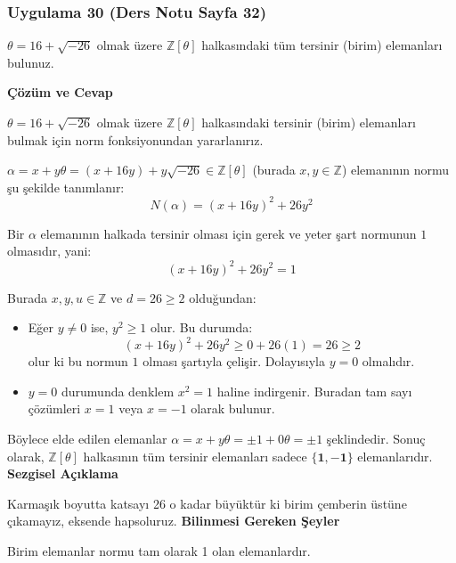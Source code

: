 \documentclass[11pt, a4paper]{article}
\newenvironment{cozum}{
    \vspace{0.5cm}
    \noindent\textcolor{green!60!black}{\faCheckCircle\enspace \textbf{\Large Çözüm ve Cevap}}\par\vspace{0.2cm}
}{}
\newenvironment{sezgisel}{
    \vspace{0.5cm}
    \noindent\textcolor{orange!80!black}{\faLightbulb\enspace \textbf{\Large Sezgisel Açıklama}}\par\vspace{0.2cm}
    \itshape
}{}
\newenvironment{bilgi}{
    \vspace{0.5cm}
    \noindent\textcolor{red!70!black}{\faExclamationTriangle\enspace \textbf{\Large Bilinmesi Gereken Şeyler}}\par\vspace{0.2cm}
}{}
\begin{document}
\subsubsection{Uygulama 30 (Ders Notu Sayfa 32)}
\begin{sorubox}
$\theta = 16 + \sqrt{-26}$ olmak üzere $\mathbb{Z}[\theta]$ halkasındaki tüm tersinir (birim) elemanları bulunuz.
\end{sorubox}
\begin{cozum}
$\theta = 16 + \sqrt{-26}$ olmak üzere $\mathbb{Z}[\theta]$ halkasındaki tersinir (birim) elemanları bulmak için norm fonksiyonundan yararlanırız.

$\alpha = x + y\theta = (x + 16y) + y\sqrt{-26} \in \mathbb{Z}[\theta]$ (burada $x, y \in \mathbb{Z}$) elemanının normu şu şekilde tanımlanır:
\[ N(\alpha) = (x + 16y)^2 + 26 y^2 \]

Bir $\alpha$ elemanının halkada tersinir olması için gerek ve yeter şart normunun $1$ olmasıdır, yani:
\[ (x + 16y)^2 + 26 y^2 = 1 \]

Burada $x, y, u \in \mathbb{Z}$ ve $d = 26 \ge 2$ olduğundan:
\begin{itemize}
    \item Eğer $y \neq 0$ ise, $y^2 \ge 1$ olur. Bu durumda:
    \[ (x + 16y)^2 + 26 y^2 \ge 0 + 26(1) = 26 \ge 2 \]
    olur ki bu normun $1$ olması şartıyla çelişir. Dolayısıyla $y = 0$ olmalıdır.
    \item $y = 0$ durumunda denklem $x^2 = 1$ haline indirgenir. Buradan tam sayı çözümleri $x = 1$ veya $x = -1$ olarak bulunur.
\end{itemize}

Böylece elde edilen elemanlar $\alpha = x + y\theta = \pm 1 + 0\theta = \pm 1$ şeklindedir. Sonuç olarak, $\mathbb{Z}[\theta]$ halkasının tüm tersinir elemanları sadece $\mathbf{\{1, -1\}}$ elemanlarıdır.
\end{cozum}
\begin{sezgisel}
Karmaşık boyutta katsayı 26 o kadar büyüktür ki birim çemberin üstüne çıkamayız, eksende hapsoluruz.
\end{sezgisel}
\begin{bilgi}
Birim elemanlar normu tam olarak 1 olan elemanlardır.
\end{bilgi}

\newpage
\end{document}
